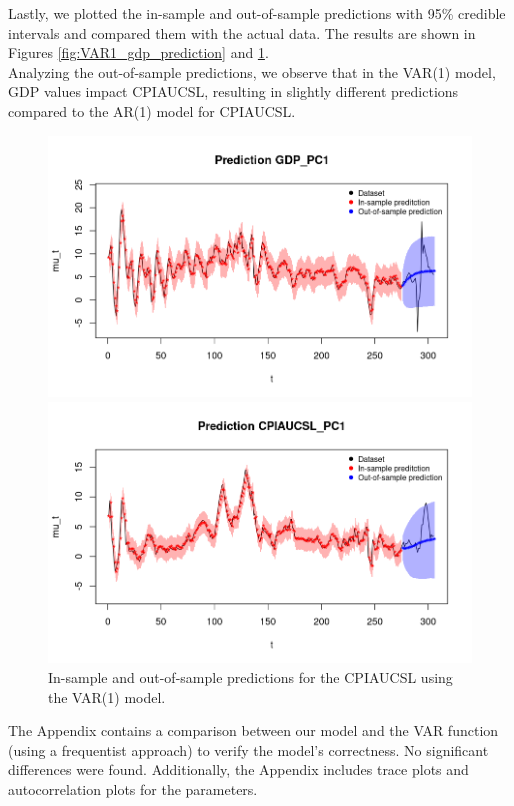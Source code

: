 Lastly, we plotted the in-sample and out-of-sample predictions with 95\% credible intervals and compared them with the actual data. The results are shown in Figures \ref{fig:VAR1_gdp_prediction} and \ref{fig:VAR1_infl_prediction}. \\ 
Analyzing the out-of-sample predictions, we observe that in the VAR(1) model, GDP values impact CPIAUCSL, resulting in slightly different predictions compared to the AR(1) model for CPIAUCSL.
\begin{figure}[H]
    \centering
    \begin{minipage}{0.5\textwidth}
        \centering
        \includegraphics[width=\textwidth]{images/6-VAR/gdp_prediction.png}
        \caption{In-sample and out-of-sample predictions for the GDP using the VAR(1) model.}
        \label{fig:VAR1_gdp_prediction} 
    \end{minipage}\hfill
    \begin{minipage}{0.5\textwidth}
        \centering
        \includegraphics[width=\textwidth]{images/6-VAR/infl_prediction.png}
        \caption{In-sample and out-of-sample predictions for the CPIAUCSL using the VAR(1) model.}
        \label{fig:VAR1_infl_prediction}
    \end{minipage}
\end{figure}
The Appendix contains a comparison between our model and the VAR function (using a frequentist approach) to verify the model's correctness. No significant differences were found. Additionally, the Appendix includes trace plots and autocorrelation plots for the parameters.